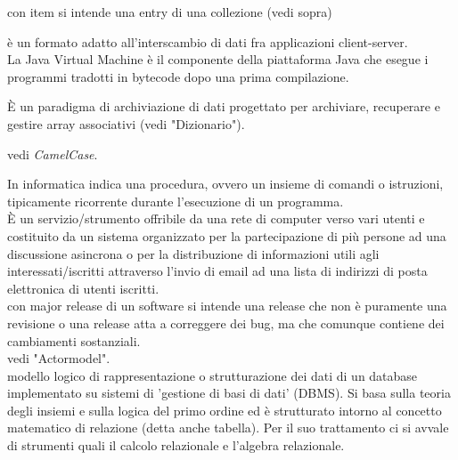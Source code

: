 \documentclass{scalatekids-article}
\begin{document}
   con item si intende una entry di una collezione (vedi sopra)
  \\


   è un formato adatto all'interscambio di dati fra applicazioni client-server.
  \\

   La Java Virtual Machine è il componente della piattaforma Java che esegue i programmi tradotti in bytecode dopo una prima compilazione.
  \\


   È un paradigma di archiviazione di dati progettato per archiviare, recuperare e gestire array associativi (vedi "Dizionario").
  \\


   vedi \textit{CamelCase}.
  \\


   In informatica indica una procedura, ovvero un insieme di comandi o istruzioni, tipicamente ricorrente durante l'esecuzione di un programma.
  \\

   È un servizio/strumento offribile da una rete di computer verso vari utenti e costituito da un sistema organizzato per la partecipazione di più persone ad una discussione asincrona o per la distribuzione di informazioni utili agli interessati/iscritti attraverso l'invio di email ad una lista di indirizzi di posta elettronica di utenti iscritti.
  \\

   con major release di un software si intende una release che non è puramente una revisione o una release atta a correggere dei bug, ma che comunque contiene dei cambiamenti sostanziali.
  \\

   vedi "Actormodel".
  \\

   modello logico di rappresentazione o strutturazione dei dati di un database implementato su sistemi di 'gestione di basi di dati' (DBMS).
  Si basa sulla teoria degli insiemi e sulla logica del primo ordine ed è strutturato intorno al concetto matematico di relazione (detta anche tabella). Per il suo trattamento ci si avvale di strumenti quali il calcolo relazionale e l'algebra relazionale.
  \\
\end{document}

